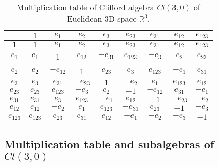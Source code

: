 \documentclass[cameraready]{jcmsi}%
\newcommand{\R}{\mathbb{R}}
\begin{document}
\begin{table}
\caption{Multiplication table of Clifford algebra $Cl(3,0)$ of Euclidean 3D space $\R^3$.}
\label{tb:Cl3mtable}
\begin{center}
\begin{tabular}{c|cccccccc}
       & $1$ & $e_1$ & $e_2$ & $e_3$ & $e_{23}$ & $e_{31}$ & $e_{12}$ & $e_{123}$\\
 \hline
 $1$     & $1$ & $e_1$ & $e_2$ & $e_3$ & $e_{23}$ & $e_{31}$ & $e_{12}$ & $e_{123}$\\
 $e_1$ & $e_1$ & 1 & $e_{12}$ & $-e_{31}$ & $e_{123}$ & $-e_3$ & $e_{2}$ & $e_{23}$\\
 $e_2$ & $e_2$ & $-e_{12}$ & 1 & $e_{23}$ & $e_3$ & $e_{123}$ & $-e_1$ & $e_{31}$ \\
 $e_3$ & $e_3$ & $e_{31}$ & $-e_{23}$ & $1$ & $-e_2$ & $e_1$ & $e_{123}$ & $e_{12}$\\
 $e_{23}$ & $e_{23}$ & $e_{123}$ & $-e_3$ & $e_2$ & $-1$ & $-e_{12}$ & $e_{31}$ & $-e_1$\\
 $e_{31}$ & $e_{31}$ & $e_3$ & $e_{123}$ & $-e_1$ & $e_{12}$ & $-1$ & $-e_{23}$ & $-e_2$\\
 $e_{12}$ & $e_{12}$ & $-e_{2}$ & $e_1$ & $e_{123}$ & $-e_{31}$ & $e_{23}$ & $-1$ & $-e_3$\\
 $e_{123}$ & $e_{123}$ & $e_{23}$ & $e_{31}$ & $e_{12}$ & $-e_1$ & $-e_2$ & $-e_3$ & $-1$
\end{tabular}
\end{center}
\end{table}


\subsection{Multiplication table and subalgebras of $Cl(3,0)$ }
\end{document}

